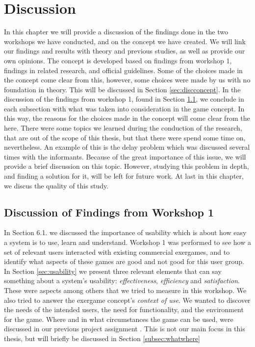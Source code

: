 \chapter{Discussion}
\label{chap:discussion}

In this chapter we will provide a discussion of the findings done in the two workshops we have conducted, and on the concept we have created. We will link our findings and results with theory and previous studies, as well as provide our own opinions. The concept is developed based on findings from workshop 1, findings in related research, and official guidelines. Some of the choices made in the concept come clear from this, however, some choices were made by us with no foundation in theory. This will be discussed in Section \ref{sec:discconcept}. In the discussion of the findings from workshop 1, found in Section \ref{sec:discfindings1}, we conclude in each subsection with what was taken into consideration in the game concept. In this way, the reasons for the choices made in the concept will come clear from the here. There were some topics we learned during the conduction of the research, that are out of the scope of this thesis, but that there were spend some time on, nevertheless. An example of this is the delay problem which was discussed several times with the informants. Because of the great importance of this issue, we will provide a brief discussion on this topic. However, studying this problem in depth, and finding a solution for it, will be left for future work. At last in this chapter, we discus the quality of this study.

\section{Discussion of Findings from Workshop 1}
\label{sec:discfindings1}

In Section 6.1. we discussed the importance of usability which is about how easy a system is to use, learn and understand. Workshop 1 was performed to see how a set of relevant users interacted with existing commercial exergames, and to identify what aspects of these games are good and not good for this user group. In Section \ref{sec:usability} we present three relevant elements that can say something about a system's usability: \emph{effectiveness}, \emph{efficiency}  and \emph{satisfaction}. These were aspects among others that we tried to measure in this workshop. We also tried to answer the exergame concept's \emph{context of use}. We wanted to discover the needs of the intended users, the need for functionality, and the environment for the game. Where and in what circumstances the game can be used, were discussed in our previous project assignment \cite{project}. This is not our main focus in this thesis, but will briefly be discussed in Section \ref{subsec:whatwhere} 


